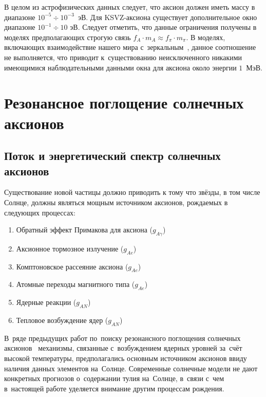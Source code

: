 \documentclass[a4paper,article,14pt]{extarticle}
\begin{document}
В целом из астрофизических данных следует, что аксион должен иметь массу в диапазоне $10^{-5} \div 10^{-3}$~эВ.
Для KSVZ-аксиона существует дополнительное окно диапазоне $10^{-1} \div 10 \text{ эВ}$.
Следует отметить, что данные ограничения получены в моделях предполагающих строгую связь $f_A \cdot m_A \approx f_{\pi} \cdot m_{\pi}$.
В моделях, включающих взаимодействие нашего мира с~зеркальным~\cite{berezhiani2001strong}, данное соотношение не выполняется, что приводит к~существованию неисключенного никакими имеющимися наблюдательными данными окна для аксиона около энергии $1$~МэВ.


\pagebreak
\section{Резонансное поглощение солнечных аксионов}

\subsection{Поток и энергетический спектр солнечных аксионов}
Существование новой частицы должно приводить к тому что звёзды, в том числе Солнце, должны являться мощным источником аксионов, рождаемых в следующих процессах:
\begin{enumerate}
    \item Обратный эффект Примакова для аксиона ($g_{A\gamma}$)
    \item Аксионное тормозное излучение ($g_{Ae}$)
    \item Комптоновское рассеяние аксиона ($g_{Ae}$)
    \item Атомные переходы магнитного типа ($g_{Ae}$)
    \item Ядерные реакции ($g_{AN}$)
    \item Тепловое возбуждение ядер ($g_{AN}$)
\end{enumerate}
В~ряде предыдущих работ по~поиску резонансного поглощения солнечных аксионов~\cite{prevax57Fe,prevaxLi7,83Kr} механизмы, связанные с~возбуждением ядерных уровней за~счёт высокой температуры, предполагались основным источником аксионов ввиду наличия данных элементов на~Солнце.
Современные солнечные модели не дают конкретных прогнозов о~содержании тулия на~Солнце, в~связи с~чем в~настоящей работе уделяется внимание другим процессам рождения.
\end{document}
